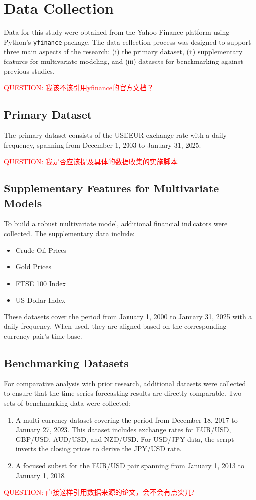 \section{Data Collection}

Data for this study were obtained from the Yahoo Finance platform using Python’s \texttt{yfinance} package.
The data collection process was designed to support three main aspects of the research: (i) the primary dataset, (ii) supplementary features for multivariate modeling, and (iii) datasets for benchmarking against previous studies.

\textcolor{red}{QUESTION: 我该不该引用yfinance的官方文档？}
\subsection{Primary Dataset}
The primary dataset consists of the USDEUR exchange rate with a daily frequency, spanning from December 1, 2003 to January 31, 2025.

\textcolor{red}{QUESTION: 我是否应该提及具体的数据收集的实施脚本}


\subsection{Supplementary Features for Multivariate Models}
To build a robust multivariate model, additional financial indicators were collected.
The supplementary data include:
\begin{itemize}
    \item Crude Oil Prices
    \item Gold Prices
    \item FTSE 100 Index
    \item US Dollar Index
\end{itemize}
These datasets cover the period from January 1, 2000 to January 31, 2025 with a daily frequency.
When used, they are aligned based on the corresponding currency pair's time base.


\subsection{Benchmarking Datasets}
For comparative analysis with prior research, additional datasets were collected to ensure that the time series forecasting results are directly comparable. Two sets of benchmarking data were collected:
\begin{enumerate}
    \item A multi-currency dataset covering the period from December 18, 2017 to January 27, 2023. This dataset includes exchange rates for EUR/USD, GBP/USD, AUD/USD, and NZD/USD. For USD/JPY data, the script inverts the closing prices to derive the JPY/USD rate\cite{Garcia2023ComparisonRegression}.
    \item A focused subset for the EUR/USD pair spanning from January 1, 2013 to January 1, 2018\cite{Yildirim2021ComparisonClassification}.
\end{enumerate}

\textcolor{red}{QUESTION: 直接这样引用数据来源的论文，会不会有点突兀?}
